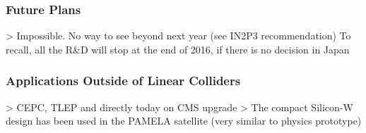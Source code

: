 \subsubsection{Future Plans}
> Impossible. No way to see beyond next year (see IN2P3 recommendation)
To recall, all the R\&D will stop at the end of 2016, if there is no decision in Japan
\subsubsection{Applications Outside of Linear Colliders}
> CEPC, TLEP and directly today on CMS upgrade
> The compact Silicon-W design has been used in the PAMELA satellite 
(very similar to physics prototype)
